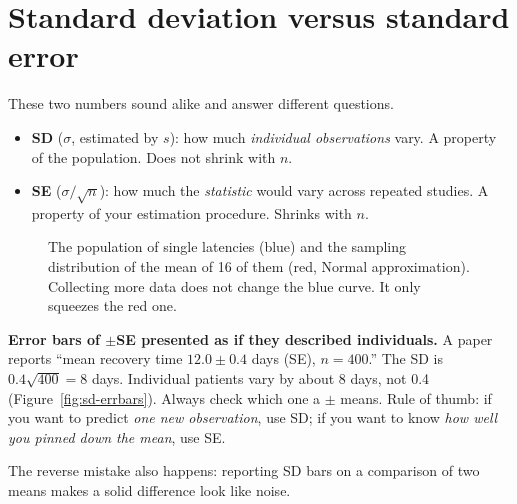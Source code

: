 \section{Standard deviation versus standard error}
\label{sec:sd-sdvsse}

These two numbers sound alike and answer different questions.

\begin{itemize}
  \item \textbf{SD} ($\sigma$, estimated by $s$): how much \emph{individual
  observations} vary. A property of the population. Does not shrink with $n$.
  \item \textbf{SE} ($\sigma/\sqrt n$): how much the \emph{statistic} would vary
  across repeated studies. A property of your estimation procedure. Shrinks with
  $n$.
\end{itemize}

\begin{figure}[H]
\centering
{}
\caption{The population of single latencies (blue) and the sampling distribution
of the mean of 16 of them (red, Normal approximation). Collecting more data
does not change the blue curve. It only squeezes the red one.}
\label{fig:sd-sdse}
\end{figure}

\begin{trapbox}
\textbf{Error bars of $\pm$SE presented as if they described individuals.} A paper
reports ``mean recovery time $12.0 \pm 0.4$ days (SE), $n=400$.'' The SD is
$0.4\sqrt{400}=8$ days. Individual patients vary by about 8 days, not 0.4
(Figure~\ref{fig:sd-errbars}). Always check which one a $\pm$ means. Rule of thumb: if you want to predict \emph{one
new observation}, use SD; if you want to know \emph{how well you pinned down the
mean}, use SE.

The reverse mistake also happens: reporting SD bars on a comparison of two means
makes a solid difference look like noise.
\end{trapbox}

